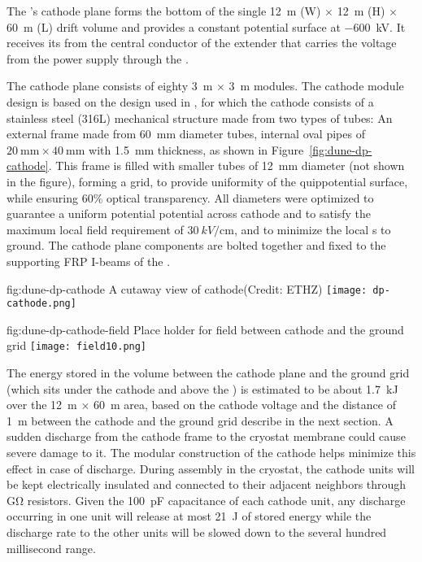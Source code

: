 The \dpmod{}'s cathode plane forms the  bottom of the single  \SI{12}{\m} (W) $\times$ \SI{12}{\m} (H) $\times$ \SI{60}{\m} (L) drift volume and provides a constant potential surface at \SI{-600}{\kV}.  It receives its \hv from the central conductor of the extender that carries the voltage from the power supply through the \hv \fdth.  

The cathode plane consists of eighty \SI{3}{\m} $\times$ \SI{3}{\m} modules. 
The cathode module design is based on the design used in  , for which the cathode consists of a stainless steel (316L) mechanical structure 
made from two types of tubes: An external frame made from \SI{60}{\milli\m} diameter tubes, internal oval pipes of $\SI{20}{\milli\m}\times \SI{40}{\milli\m}$ with \SI{1.5}{mm} thickness, as shown in Figure~\ref{fig:dune-dp-cathode}. 
This frame is filled with smaller tubes of \SI{12}{\milli\m} diameter (not shown in the figure), forming a grid, to provide uniformity of the quippotential surface, while ensuring 60\% optical transparency. All diameters were optimized to guarantee a uniform potential  potential across cathode and to satisfy the maximum local field requirement of $\SI{30}{kV/\centi\m}$, and to minimize the local \efield{}s to ground. 
The cathode plane components are bolted together and fixed to the supporting FRP I-beams of the \fc. 


\begin{dunefigure}{fig:dune-dp-cathode}
{A cutaway view of  cathode(Credit: ETHZ)}
\texttt{[image: dp-cathode.png]}
\end{dunefigure}

\begin{dunefigure}{fig:dune-dp-cathode-field}
{Place holder for field between cathode and the ground grid} 
\texttt{[image: field10.png]}
\end{dunefigure}

The energy stored in the volume between the cathode plane and the ground grid (which sits under the cathode and above the ) is estimated to be about \SI{1.7}{\kilo\joule} over the \SI{12}{\m} $\times$ \SI{60}{\m} area, based on the cathode voltage and the distance of \SI{1}{\m} between the cathode and the ground grid describe in the next section. 
A sudden discharge from the cathode frame to the cryostat membrane could cause severe damage to it.  The modular construction of the cathode helps minimize this effect in case of discharge. During assembly in the cryostat, the cathode units will be kept electrically insulated and connected to their adjacent neighbors through \si{\giga\ohm}  
resistors. Given the \SI{100}{\pico\farad} capacitance of each cathode unit, any discharge occurring in one unit will release at most 
\SI{21}{\joule} of stored energy while the discharge rate  
to the other units will be slowed down to the several hundred millisecond range.

